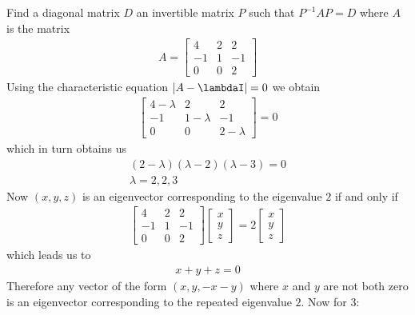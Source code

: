 \documentclass[a4paper]{article}
\theoremstyle{plain}
\theoremstyle{definition}
\newtheorem{exmp}{Example}[section]
\theoremstyle{remark}
\begin{document}
\begin{tcolorbox}[colback=black!3!white,colframe=black!60!white,title=\begin{exmp}Example 1 \label{Example 1}\end{exmp}]
        Find a diagonal matrix $D$ an invertible matrix $P$ such that $P^{-1}AP = D$ where $A$ is the matrix
                \begin{align}
			A = \begin{bmatrix} 4 & 2 & 2 \\ -1 & 1 & -1 \\ 0 & 0 & 2 \end{bmatrix} 
                \end{align}
		Using the characteristic equation $|A - \lambdaI| = 0$ we obtain
		\begin{align}
			\begin{bmatrix} 4 - \lambda & 2 & 2 \\ -1 & 1 - \lambda & -1 \\ 0 & 0 & 2 - \lambda \end{bmatrix} = 0
		\end{align}
		which in turn obtains us
		\begin{align*}
			(2-\lambda)(\lambda-2)(\lambda-3) = 0\\
			\lambda = 2,2,3
		\end{align*}
		Now $(x,y,z)$ is an eigenvector corresponding to the eigenvalue $2$ if and only if
		\begin{align*}
			\begin{bmatrix}  4 & 2 & 2 \\ -1 & 1 & -1 \\ 0 & 0 & 2 \end{bmatrix} \begin{bmatrix} x \\ y \\ z \end{bmatrix} = 2 \begin{bmatrix} x \\ y \\ z \end{bmatrix} 
		\end{align*}
		which leads us to
		\begin{align*}
			x+y+z = 0
		\end{align*}
		Therefore any vector of the form $(x,y,-x-y)$ where $x$ and $y$ are not both zero is an eigenvector corresponding to the repeated eigenvalue $2 $. Now for 3:
		\begin{align*}

\end{align*}
\end{tcolorbox}
\end{document}
